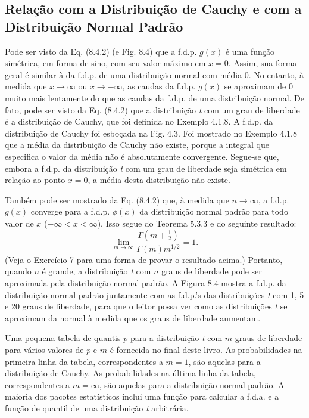 \subsection*{Relação com a Distribuição de Cauchy e com a Distribuição Normal Padrão}

Pode ser visto da Eq. (8.4.2) (e Fig. 8.4) que a f.d.p. $g(x)$ é uma função simétrica, em forma de sino, com seu valor máximo em $x=0$. Assim, sua forma geral é similar à da f.d.p. de uma distribuição normal com média 0. No entanto, à medida que $x \to \infty$ ou $x \to -\infty$, as caudas da f.d.p. $g(x)$ se aproximam de 0 muito mais lentamente do que as caudas da f.d.p. de uma distribuição normal. De fato, pode ser visto da Eq. (8.4.2) que a distribuição \textit{t} com um grau de liberdade é a distribuição de Cauchy, que foi definida no Exemplo 4.1.8. A f.d.p. da distribuição de Cauchy foi esboçada na Fig. 4.3. Foi mostrado no Exemplo 4.1.8 que a média da distribuição de Cauchy não existe, porque a integral que especifica o valor da média não é absolutamente convergente. Segue-se que, embora a f.d.p. da distribuição \textit{t} com um grau de liberdade seja simétrica em relação ao ponto $x=0$, a média desta distribuição não existe.

Também pode ser mostrado da Eq. (8.4.2) que, à medida que $n \to \infty$, a f.d.p. $g(x)$ converge para a f.d.p. $\phi(x)$ da distribuição normal padrão para todo valor de $x$ ($-\infty < x < \infty$). Isso segue do Teorema 5.3.3 e do seguinte resultado:
\begin{equation} \label{eq:8.4.6}
    \lim_{m \to \infty} \frac{\Gamma\left(m + \frac{1}{2}\right)}{\Gamma(m)m^{1/2}} = 1.
\end{equation}
(Veja o Exercício 7 para uma forma de provar o resultado acima.) Portanto, quando $n$ é grande, a distribuição \textit{t} com $n$ graus de liberdade pode ser aproximada pela distribuição normal padrão. A Figura 8.4 mostra a f.d.p. da distribuição normal padrão juntamente com as f.d.p.'s das distribuições \textit{t} com 1, 5 e 20 graus de liberdade, para que o leitor possa ver como as distribuições \textit{t} se aproximam da normal à medida que os graus de liberdade aumentam.

Uma pequena tabela de quantis $p$ para a distribuição \textit{t} com $m$ graus de liberdade para vários valores de $p$ e $m$ é fornecida no final deste livro. As probabilidades na primeira linha da tabela, correspondentes a $m=1$, são aquelas para a distribuição de Cauchy. As probabilidades na última linha da tabela, correspondentes a $m = \infty$, são aquelas para a distribuição normal padrão. A maioria dos pacotes estatísticos inclui uma função para calcular a f.d.a. e a função de quantil de uma distribuição \textit{t} arbitrária.

